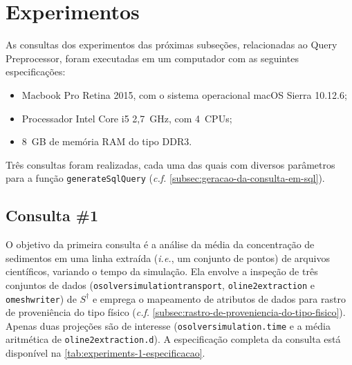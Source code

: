 
\section{Experimentos}

As consultas dos experimentos das próximas subseções, relacionadas ao Query Preprocessor, foram executadas em um computador com as seguintes especificações:

\begin{itemize}
	\item Macbook Pro Retina 2015, com o sistema operacional macOS Sierra 10.12.6;
    \item Processador Intel Core i5 2,7~GHz, com 4~CPUs;
    \item 8~GB de memória RAM do tipo DDR3.
\end{itemize}

Três consultas foram realizadas, cada uma das quais com diversos parâmetros para a função \texttt{generateSqlQuery} (\textit{c.f.} \autoref{subsec:geracao-da-consulta-em-sql}).

\subsection{Consulta \#1}

%

%

O objetivo da primeira consulta é a análise da média da concentração de sedimentos em uma linha extraída (\textit{i.e.}, um conjunto de pontos) de arquivos científicos, variando o tempo da simulação. Ela envolve a inspeção de três conjuntos de dados (\texttt{osolversimulationtransport}, \texttt{oline2extraction} e \texttt{omeshwriter}) de \(S^{\dagger}\) e emprega o mapeamento de atributos de dados para rastro de proveniência do tipo físico (\textit{c.f.} \autoref{subsec:rastro-de-proveniencia-do-tipo-fisico}). Apenas duas projeções são de interesse (\texttt{osolversimulation.time} e a média aritmética de \texttt{oline2extraction.d}). A especificação completa da consulta está disponível na \autoref{tab:experiments-1-especificacao}.

